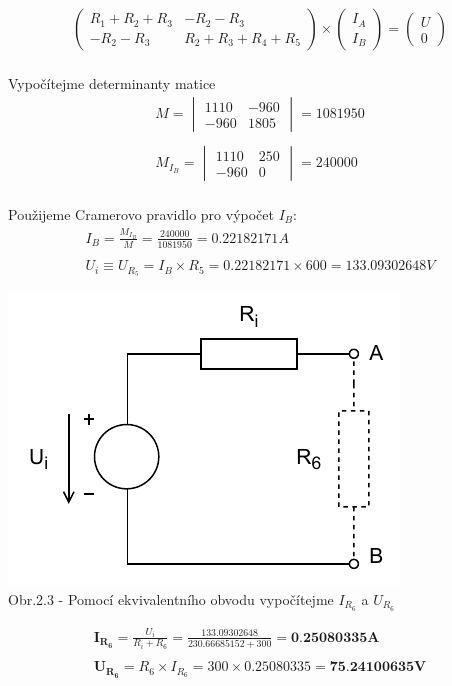 \begin{gather*}
    \begin{pmatrix}
    R_1 + R_2 + R_3 & -R_2 - R_3 \\
    -R_2 - R_3 & R_2 + R_3 + R_4 + R_5
    \end{pmatrix}
    \times
    \begin{pmatrix}
    I_A \\
    I_B
    \end{pmatrix}
    =
    \begin{pmatrix}
    U \\
    0
    \end{pmatrix}
\end{gather*}
\\
Vypočítejme determinanty matice
\begin{gather*}
    M =
    \begin{vmatrix}
    1110 & -960 \\
    -960 & 1805
    \end{vmatrix}
    =
    1081950
    \\\\
    M_{I_B} =
    \begin{vmatrix}
    1110 & 250 \\
    -960 & 0
    \end{vmatrix}
    =
    240000
\end{gather*}
\\
Použijeme Cramerovo pravidlo pro výpočet $I_B$:
\begin{gather*}
    I_B = \frac{M_{I_B}}{M} = \frac{240000}{1081950} = 0.22182171 A
    \\\\
    U_i \equiv U_{R_5} = I_B \times R_5 = 0.22182171 \times 600 = 133.09302648 V
\end{gather*}

\newpage

\begin{center}
    \includegraphics[scale=0.8,keepaspectratio]{fig/solutions/02-sol/02-step3.pdf} \\
    Obr.2.3 - Pomocí ekvivalentního obvodu vypočítejme $I_{R_6}$ a $U_{R_6}$
\end{center}

\begin{gather*}
    \boldsymbol{I_{R_6}} = \frac{U_i}{R_i + R_6} = \frac{133.09302648}{230.66685152 + 300} = \textbf{0.25080335A} \\\\
    \boldsymbol{U_{R_6}} = R_6 \times I_{R_6} = 300 \times 0.25080335 = \textbf{75.24100635V}
\end{gather*}